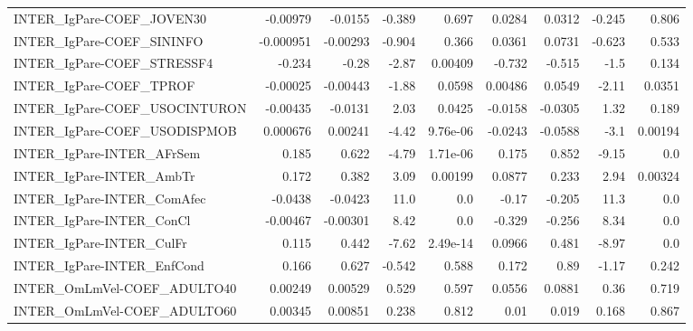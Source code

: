 \begin{tabular}{lrrrrrrrr}
INTER\_IgPare-COEF\_JOVEN30              &    -0.00979 &      -0.0155 &   -0.389 &    0.697 &     0.0284 &      0.0312 &       -0.245 &         0.806 \\
INTER\_IgPare-COEF\_SININFO              &   -0.000951 &     -0.00293 &   -0.904 &    0.366 &     0.0361 &      0.0731 &       -0.623 &         0.533 \\
INTER\_IgPare-COEF\_STRESSF4             &      -0.234 &        -0.28 &    -2.87 &  0.00409 &     -0.732 &      -0.515 &         -1.5 &         0.134 \\
INTER\_IgPare-COEF\_TPROF                &    -0.00025 &     -0.00443 &    -1.88 &   0.0598 &    0.00486 &      0.0549 &        -2.11 &        0.0351 \\
INTER\_IgPare-COEF\_USOCINTURON          &    -0.00435 &      -0.0131 &     2.03 &   0.0425 &    -0.0158 &     -0.0305 &         1.32 &         0.189 \\
INTER\_IgPare-COEF\_USODISPMOB           &    0.000676 &      0.00241 &    -4.42 & 9.76e-06 &    -0.0243 &     -0.0588 &         -3.1 &       0.00194 \\
INTER\_IgPare-INTER\_AFrSem              &       0.185 &        0.622 &    -4.79 & 1.71e-06 &      0.175 &       0.852 &        -9.15 &           0.0 \\
INTER\_IgPare-INTER\_AmbTr               &       0.172 &        0.382 &     3.09 &  0.00199 &     0.0877 &       0.233 &         2.94 &       0.00324 \\
INTER\_IgPare-INTER\_ComAfec             &     -0.0438 &      -0.0423 &     11.0 &      0.0 &      -0.17 &      -0.205 &         11.3 &           0.0 \\
INTER\_IgPare-INTER\_ConCl               &    -0.00467 &     -0.00301 &     8.42 &      0.0 &     -0.329 &      -0.256 &         8.34 &           0.0 \\
INTER\_IgPare-INTER\_CulFr               &       0.115 &        0.442 &    -7.62 & 2.49e-14 &     0.0966 &       0.481 &        -8.97 &           0.0 \\
INTER\_IgPare-INTER\_EnfCond             &       0.166 &        0.627 &   -0.542 &    0.588 &      0.172 &        0.89 &        -1.17 &         0.242 \\
INTER\_OmLmVel-COEF\_ADULTO40            &     0.00249 &      0.00529 &    0.529 &    0.597 &     0.0556 &      0.0881 &         0.36 &         0.719 \\
INTER\_OmLmVel-COEF\_ADULTO60            &     0.00345 &      0.00851 &    0.238 &    0.812 &       0.01 &       0.019 &        0.168 &         0.867 \\

\end{tabular}
